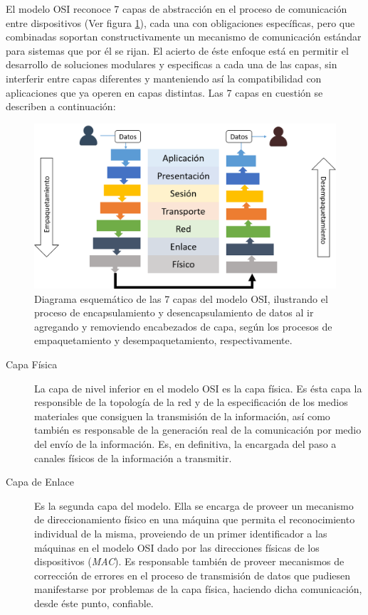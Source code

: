 \begin{intro}
El modelo OSI reconoce 7 capas de abstracción en el proceso de comunicación entre dispositivos (Ver figura \ref{fig:osi7capas}), cada una con obligaciones específicas, pero que combinadas soportan constructivamente un mecanismo de comunicación estándar para sistemas que por él se rijan. El acierto de éste enfoque está en permitir el desarrollo de soluciones modulares y especificas a cada una de las capas, sin interferir entre capas diferentes y manteniendo así la compatibilidad con aplicaciones que ya operen en capas distintas. Las 7 capas en cuestión se describen a continuación:

\begin{figure}[!h]
	\centering
	\includegraphics[scale=.45]{imagenes/OSI7Capas.png}
	\caption{Diagrama esquemático de las 7 capas del modelo OSI, ilustrando el proceso de encapsulamiento y desencapsulamiento de datos al ir agregando y removiendo encabezados de capa, según los procesos de empaquetamiento y desempaquetamiento, respectivamente.}
	\label{fig:osi7capas}
\end{figure}

\begin{description}
\item[Capa Física] La capa de nivel inferior en el modelo OSI es la capa física. Es ésta capa la responsible de la topología de la red y de la especificación de los medios materiales que consiguen la transmisión de la información, así como también es responsable de la generación real de la comunicación por medio del envío de la información. Es, en definitiva, la encargada del paso a canales físicos de la información a transmitir.

\item[Capa de Enlace] Es la segunda capa del modelo. Ella se encarga de proveer un mecanismo de direccionamiento físico en una máquina que permita el reconocimiento individual de la misma, proveiendo de un primer identificador a las máquinas en el modelo OSI dado por las direcciones físicas de los dispositivos (\emph{MAC}). Es responsable también de proveer mecanismos de corrección de errores en el proceso de transmisión de datos que pudiesen manifestarse por problemas de la capa física, haciendo dicha comunicación, desde éste punto, confiable.


\end{description}
\end{intro}
